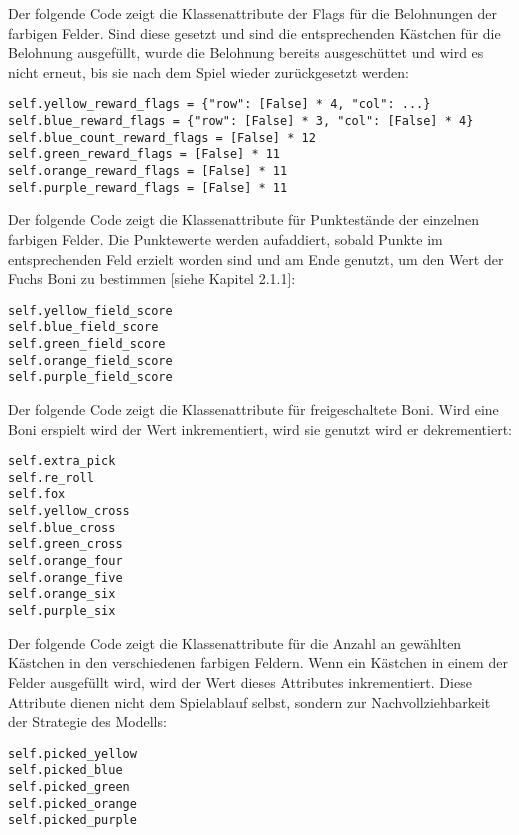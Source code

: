 \begin{minipage}{\linewidth}
Der folgende Code zeigt die Klassenattribute der Flags für die Belohnungen der farbigen Felder. Sind diese gesetzt und sind die entsprechenden Kästchen für die Belohnung ausgefüllt, wurde die Belohnung bereits ausgeschüttet und wird es nicht erneut, bis sie nach dem Spiel wieder zurückgesetzt werden:
\vspace{0.5cm}
\begin{lstlisting}[caption={Klassenattribute für Belohnungsflags}]
self.yellow_reward_flags = {"row": [False] * 4, "col": ...}
self.blue_reward_flags = {"row": [False] * 3, "col": [False] * 4}
self.blue_count_reward_flags = [False] * 12
self.green_reward_flags = [False] * 11
self.orange_reward_flags = [False] * 11
self.purple_reward_flags = [False] * 11
\end{lstlisting}
\end{minipage}

\begin{minipage}{\linewidth}
Der folgende Code zeigt die Klassenattribute für Punktestände der einzelnen farbigen Felder. Die Punktewerte werden aufaddiert, sobald Punkte im entsprechenden Feld erzielt worden sind und am Ende genutzt, um den Wert der Fuchs Boni zu bestimmen [siehe Kapitel 2.1.1]:
\vspace{0.5cm}
\begin{lstlisting}[caption={Klassenattribute für Punktestände der Felder}]
self.yellow_field_score
self.blue_field_score
self.green_field_score
self.orange_field_score
self.purple_field_score
\end{lstlisting}
\end{minipage}

\begin{minipage}{\linewidth}
Der folgende Code zeigt die Klassenattribute für freigeschaltete Boni. Wird eine Boni erspielt wird der Wert inkrementiert, wird sie genutzt wird er dekrementiert:
\vspace{0.5cm}
\begin{lstlisting}[caption={Klassenattribute für freigespielte Boni}]
self.extra_pick
self.re_roll
self.fox
self.yellow_cross
self.blue_cross
self.green_cross
self.orange_four
self.orange_five
self.orange_six
self.purple_six
\end{lstlisting}
\end{minipage}

\begin{minipage}{\linewidth}
Der folgende Code zeigt die Klassenattribute für die Anzahl an gewählten Kästchen in den verschiedenen farbigen Feldern. Wenn ein Kästchen in einem der Felder ausgefüllt wird, wird der Wert dieses Attributes inkrementiert. Diese Attribute dienen nicht dem Spielablauf selbst, sondern zur Nachvollziehbarkeit der Strategie des Modells:
\vspace{0.5cm}
\begin{lstlisting}[caption={Klassenattribute für gewählte Kästchen in den farbigen Feldern}]
self.picked_yellow
self.picked_blue
self.picked_green
self.picked_orange
self.picked_purple
\end{lstlisting}
\end{minipage}

